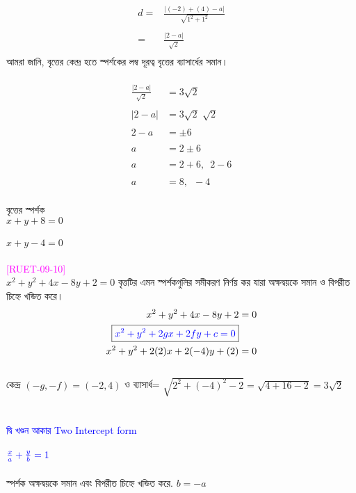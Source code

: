 \documentclass{article}
\begin{document}
\begin{align*}
	d=	&\frac{|(-2)+(4)-a|}{\sqrt{1^2+1^2}}\\
	\\
	=	&	\frac{|2-a|}{\sqrt{2}}\\
\end{align*}
আমরা জানি, বৃত্তের কেন্দ্র হতে স্পর্শকের লম্ব দূরত্ব বৃত্তের ব্যাসার্ধের সমান। \\
\\ 
\begin{align*}
	\frac{|2-a|}{\sqrt{2}}&=3\sqrt{2}\\
	\\
|2-a|&=3\sqrt{2}\,\,\sqrt{2}\\
	\\
	2-a&=\pm 6\\
	\\
	a&=2\pm 6\\
	\\
	a&=2+6,\,\,\,2-6\\
	\\
	a&=8,\,\,\,-4
\end{align*}
\\
বৃত্তের স্পর্শক \\ 
$x+y+8=0$\\
\\
$x+y-4=0$\\
\\
\textcolor{magenta}{[RUET-09-10]}\\
$x^2+y^2+4x-8y+2=0$ বৃত্তটির এমন স্পর্শকগুলির সমীকরণ নির্ণয় কর যারা অক্ষদ্বয়কে সমান ও বিপরীত চিহ্নে খন্ডিত করে। \\
	\begin{align*}
	x^2+y^2+4x-8y+2&=0\\
	\boxed{\textcolor{blue}{x^2+y^2+2gx+2fy+c=0}}&\\
	x^2+y^2+2(2)x+2(-4)y+(2)&=0
\end{align*}
\\
কেন্দ্র 	$(-g,-f)=(-2,4)$ ও ব্যাসার্ধ= $\sqrt{2^2+(-4)^2-2}=\sqrt{4+16-2}=3\sqrt{2}$\\
\\  
\\
\textcolor{blue}{ দ্বি খণ্ডন আকার  Two	Intercept form}\\
\\
$\textcolor{blue}{\frac{x}{a}+\frac{y}{b}=1}$\\
\\
স্পর্শক অক্ষদ্বয়কে সমান এবং বিপরীত চিহ্নে খন্ডিত করে. $b=-a$\\
\\
\end{document}
